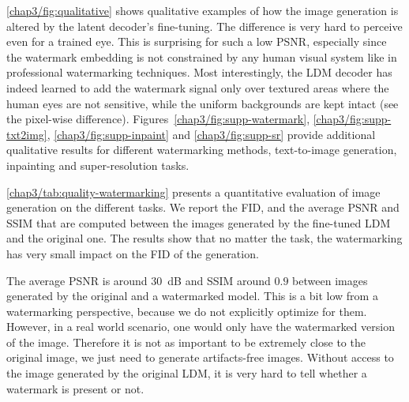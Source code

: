 \autoref{chap3/fig:qualitative} shows qualitative examples of how the image generation is altered by the latent decoder's fine-tuning. 
The difference is very hard to perceive even for a trained eye. 
This is surprising for such a low PSNR, especially since the watermark embedding is not constrained by any human visual system like in professional watermarking techniques. 
Most interestingly, the LDM decoder has indeed learned to add the watermark signal only over textured areas where the human eyes are not sensitive, while the uniform backgrounds are kept intact (see the pixel-wise difference).
Figures~\ref{chap3/fig:supp-watermark}, \ref{chap3/fig:supp-txt2img}, \ref{chap3/fig:supp-inpaint} and \ref{chap3/fig:supp-sr} provide additional qualitative results for different watermarking methods, text-to-image generation, inpainting and super-resolution tasks.

\autoref{chap3/tab:quality-watermarking} presents a quantitative evaluation of image generation on the different tasks.
We report the FID, and the average PSNR and SSIM that are computed between the images generated by the fine-tuned LDM and the original one.
The results show that no matter the task, the watermarking has very small impact on the FID of the generation.

The average PSNR is around $30$~dB and SSIM around $0.9$ between images generated by the original and a  watermarked model.
This is a bit low from a watermarking perspective, because we do not explicitly optimize for them.
However, in a real world scenario, one would only have the watermarked version of the image. 
Therefore it is not as important to be extremely close to the original image, we just need to generate artifacts-free images. Without access to the image generated by the original LDM, it is very hard to tell whether a watermark is present or not.




